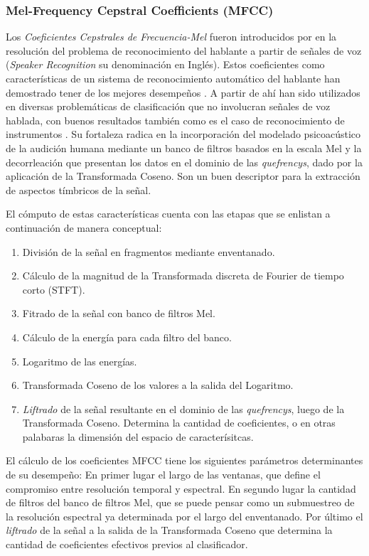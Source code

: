 \documentclass{article}
\begin{document}
\subsubsection{Mel-Frequency Cepstral Coefficients (MFCC)} 

Los \textit{Coeficientes Cepstrales de Frecuencia-Mel} fueron introducidos por \cite{davis1980comparison} en la resolución del problema de reconocimiento del hablante a partir de señales de voz (\textit{Speaker Recognition} su denominación en Inglés). Estos coeficientes como características de un sistema de reconocimiento automático del hablante han demostrado tener de los mejores desempeños \citep[Capítulo~14]{quatieri2002discrete}. A partir de ahí han sido utilizados en diversas problemáticas de clasificación que no involucran señales de voz hablada, con buenos resultados también como es el caso de reconocimiento de instrumentos \citep[Capítulo~6]{klapuri2007signal}. Su fortaleza radica en la incorporación del modelado psicoacústico de la audición humana mediante un banco de filtros basados en la escala Mel \citep{stevens1937scale} y la decorrleación que presentan los datos en el dominio de las \textit{quefrencys}, dado por la aplicación de la Transformada Coseno. Son un buen descriptor para la extracción de aspectos tímbricos de la señal.
\medskip

El cómputo de estas características cuenta con las etapas que se enlistan a continuación de manera conceptual: 

\begin{enumerate}
	\item División de la señal en fragmentos mediante enventanado.
	\item Cálculo de la magnitud de la Transformada discreta de Fourier de tiempo corto (STFT).
	\item Fitrado de la señal con banco de filtros Mel.
	\item Cálculo de la energía para cada filtro del banco.
	\item Logaritmo de las energías.
	\item Transformada Coseno de los valores a la salida del Logaritmo.
	\item \textit{Liftrado} de la señal resultante en el dominio de las \textit{quefrencys}, luego de la Transformada Coseno. Determina la cantidad de coeficientes, o en otras palabaras la dimensión del espacio de caracterísitcas.
\end{enumerate}

El cálculo de los coeficientes MFCC tiene los siguientes parámetros determinantes de su desempeño: En primer lugar el largo de las ventanas, que define el compromiso entre resolución temporal y espectral. En segundo lugar la cantidad de filtros del banco de filtros Mel, que se puede pensar como un submuestreo de la resolución espectral ya determinada por el largo del enventanado. Por último el \textit{liftrado} de la señal a la salida de la Transformada Coseno que determina la cantidad de coeficientes efectivos previos al clasificador.
\medskip
\end{document}
